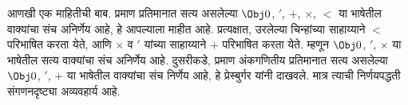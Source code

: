 आणखी एक माहितीची बाब. प्रमाण प्रतिमानात सत्य असलेल्या
$\Obj 0$, $'$, $+$, $\times$, $<$ या भाषेतील वाक्यांचा
संच अनिर्णेय आहे, हे आपल्याला माहीत आहे. प्रत्यक्षात,
उरलेल्या चिन्हांच्या साहाय्याने $<$ परिभाषित करता येते,
आणि $\times$ व $'$ यांच्या साहाय्याने $+$ परिभाषित
करता येते. म्हणून $\Obj 0$, $'$, $\times$ या भाषेतील
सत्य वाक्यांचा संच अनिर्णेय आहे. दुसरीकडे, प्रमाण
अंकगणितीय प्रतिमानात सत्य असलेल्या $\Obj 0$, $'$, $+$
या भाषेतील वाक्यांचा संच निर्णेय आहे, हे प्रेस्बुर्गर यांनी
दाखवले. मात्र त्याची निर्णयपद्धती संगणनदृष्ट्या अव्यवहार्य आहे.



